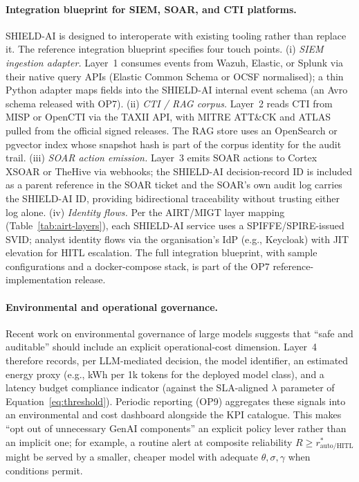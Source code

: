 \documentclass[preprint,12pt,authoryear]{elsarticle}
\begin{document}
\paragraph{Integration blueprint for SIEM, SOAR, and CTI platforms.}
SHIELD-AI is designed to interoperate with existing tooling rather than replace it. The reference integration blueprint specifies four touch points. (i) \emph{SIEM ingestion adapter.} Layer~1 consumes events from Wazuh, Elastic, or Splunk via their native query APIs (Elastic Common Schema or OCSF normalised); a thin Python adapter maps fields into the SHIELD-AI internal event schema (an Avro schema released with OP7). (ii) \emph{CTI / RAG corpus.} Layer~2 reads CTI from MISP or OpenCTI via the TAXII API, with MITRE ATT\&CK and ATLAS pulled from the official signed releases. The RAG store uses an OpenSearch or pgvector index whose snapshot hash is part of the corpus identity for the audit trail. (iii) \emph{SOAR action emission.} Layer~3 emits SOAR actions to Cortex XSOAR or TheHive via webhooks; the SHIELD-AI decision-record ID is included as a parent reference in the SOAR ticket and the SOAR's own audit log carries the SHIELD-AI ID, providing bidirectional traceability without trusting either log alone. (iv) \emph{Identity flows.} Per the AIRT/MIGT layer mapping (Table~\ref{tab:airt-layers}), each SHIELD-AI service uses a SPIFFE/SPIRE-issued SVID; analyst identity flows via the organisation's IdP (e.g., Keycloak) with JIT elevation for HITL escalation. The full integration blueprint, with sample configurations and a docker-compose stack, is part of the OP7 reference-implementation release.

\paragraph{Environmental and operational governance.}
Recent work on environmental governance of large models suggests that ``safe and auditable'' should include an explicit operational-cost dimension. Layer~4 therefore records, per LLM-mediated decision, the model identifier, an estimated energy proxy (e.g., kWh per 1k tokens for the deployed model class), and a latency budget compliance indicator (against the SLA-aligned $\lambda$ parameter of Equation~\ref{eq:threshold}). Periodic reporting (OP9) aggregates these signals into an environmental and cost dashboard alongside the KPI catalogue. This makes ``opt out of unnecessary GenAI components'' an explicit policy lever rather than an implicit one; for example, a routine alert at composite reliability $R \geq r^*_{\text{auto/HITL}}$ might be served by a smaller, cheaper model with adequate $\theta, \sigma, \gamma$ when conditions permit.
\end{document}
